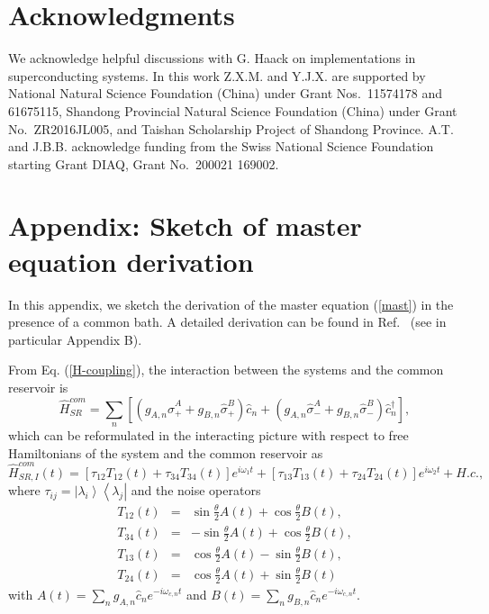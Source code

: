 \documentclass[12pt]{iopart}
\begin{document}
\section*{Acknowledgments}

We acknowledge helpful discussions with G. Haack on implementations in superconducting systems. In this work Z.X.M. and Y.J.X. are supported by National Natural Science Foundation (China) under Grant Nos.~11574178 and 61675115, Shandong Provincial Natural Science Foundation (China) under Grant No.~ZR2016JL005, and
Taishan Scholarship Project of Shandong Province. A.T. and J.B.B. acknowledge funding from the Swiss National Science Foundation starting Grant DIAQ, Grant No.~200021 169002.

\appendix
\setcounter{section}{1}

\section*{Appendix: Sketch of master equation derivation}

In this appendix, we sketch the derivation of the master equation (\ref{mast}) in the presence of a common bath. A detailed derivation can be found in Ref.~\cite{equi7} (see in particular Appendix B).

From Eq. (\ref{H-coupling}), the interaction between the systems and the common reservoir is
\begin{equation}
\label{H-com}
\hat{H}_{SR}^{com} = \sum_{n}\left[\left(g_{A,n}\hat{\sigma}_{+}^{A}+g_{B,n}\hat{\sigma}_{+}^{B}\right)\hat{c}_{n}+
\left(g_{A,n}\hat{\sigma}_{-}^{A}+g_{B,n}\hat{\sigma}_{-}^{B}\right)\hat{c}_{n}^{\dag}\right],
\end{equation}
which can be reformulated in the interacting picture with respect to free Hamiltonians of the system and the common reservoir as
\begin{equation}
\label{Hint-com}
\hat{H}_{SR,I}^{com}(t)=\left[\tau_{12}T_{12}(t)+\tau_{34}T_{34}(t)\right]e^{i\omega_{1}t}
+\left[\tau_{13}T_{13}(t)+\tau_{24}T_{24}(t)\right]e^{i\omega_{2}t}+H.c.,
\end{equation}
where $\tau_{ij}=\left|\lambda_{i}\right\rangle\left\langle\lambda_{j}\right|$ and the noise operators
\begin{eqnarray}
  T_{12}(t) &=& \sin\frac{\theta}{2}A(t)+\cos\frac{\theta}{2}B(t), \nonumber\\
 T_{34}(t) &=& -\sin\frac{\theta}{2}A(t)+\cos\frac{\theta}{2}B(t), \nonumber\\
  T_{13}(t) &=& \cos\frac{\theta}{2}A(t)-\sin\frac{\theta}{2}B(t), \nonumber\\
   T_{24}(t) &=& \cos\frac{\theta}{2}A(t)+\sin\frac{\theta}{2}B(t)
\end{eqnarray}
with $A(t)=\sum_{n}g_{A,n}\hat{c}_{n}e^{-i\omega_{c,n}t}$
and $B(t)=\sum_{n}g_{B,n}\hat{c}_{n}e^{-i\omega_{c,n}t}$.
\end{document}
